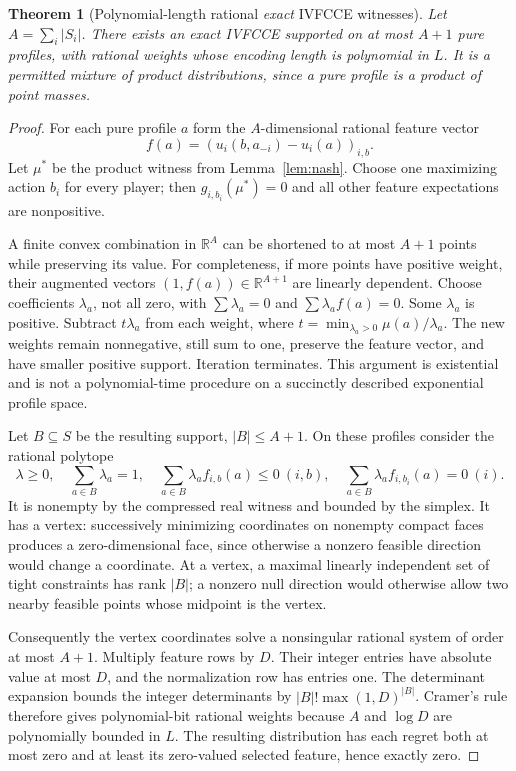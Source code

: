\documentclass[11pt,a4paper]{article}
\newtheorem{theorem}{Theorem}[section]
\theoremstyle{definition}\newtheorem{definition}[theorem]{Definition}
\theoremstyle{remark}\newtheorem{remark}[theorem]{Remark}
\newcommand{\R}{\mathbb R}\newcommand{\Q}{\mathbb Q}
\newcommand{\1}{\mathbf 1}
\begin{document}
\begin{theorem}[Polynomial-length rational \emph{exact} IVFCCE witnesses]\label{thm:witness}
Let $A=\sum_i|S_i|$. There exists an exact IVFCCE supported on at most $A+1$ pure profiles, with rational weights whose encoding length is polynomial in $L$. It is a permitted mixture of product distributions, since a pure profile is a product of point masses.
\end{theorem}
\begin{proof}
For each pure profile $a$ form the $A$-dimensional rational feature vector
\[
 f(a)=(u_i(b,a_{-i})-u_i(a))_{i,b}.
\]
Let $\mu^*$ be the product witness from Lemma~\ref{lem:nash}. Choose one maximizing action $b_i$ for every player; then
$g_{i,b_i}(\mu^*)=0$ and all other feature expectations are nonpositive.

A finite convex combination in $\R^A$ can be shortened to at most $A+1$ points while preserving its value. For completeness, if more points have positive weight, their augmented vectors $(1,f(a))\in\R^{A+1}$ are linearly dependent. Choose coefficients $\lambda_a$, not all zero, with $\sum\lambda_a=0$ and $\sum\lambda_af(a)=0$. Some $\lambda_a$ is positive. Subtract $t\lambda_a$ from each weight, where $t=\min_{\lambda_a>0}\mu(a)/\lambda_a$. The new weights remain nonnegative, still sum to one, preserve the feature vector, and have smaller positive support. Iteration terminates. This argument is existential and is not a polynomial-time procedure on a succinctly described exponential profile space.

Let $B\subseteq S$ be the resulting support, $|B|\le A+1$. On these profiles consider the rational polytope
\[
 \lambda\ge0,\quad\sum_{a\in B}\lambda_a=1,\quad
 \sum_{a\in B}\lambda_af_{i,b}(a)\le0\ (i,b),\quad
 \sum_{a\in B}\lambda_af_{i,b_i}(a)=0\ (i).
\]
It is nonempty by the compressed real witness and bounded by the simplex. It has a vertex: successively minimizing coordinates on nonempty compact faces produces a zero-dimensional face, since otherwise a nonzero feasible direction would change a coordinate. At a vertex, a maximal linearly independent set of tight constraints has rank $|B|$; a nonzero null direction would otherwise allow two nearby feasible points whose midpoint is the vertex.

Consequently the vertex coordinates solve a nonsingular rational system of order at most $A+1$. Multiply feature rows by $D$. Their integer entries have absolute value at most $D$, and the normalization row has entries one. The determinant expansion bounds the integer determinants by $|B|!\max(1,D)^{|B|}$. Cramer's rule therefore gives polynomial-bit rational weights because $A$ and $\log D$ are polynomially bounded in $L$. The resulting distribution has each regret both at most zero and at least its zero-valued selected feature, hence exactly zero.
\end{proof}
\end{document}
